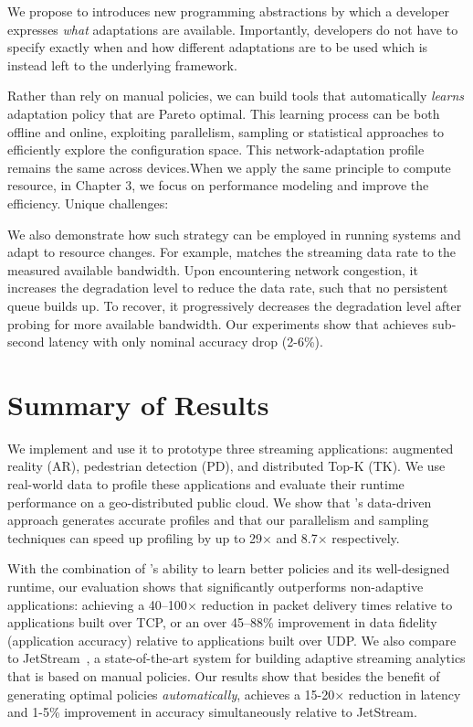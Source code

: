 \documentclass[thesis.tex]{subfiles}
\begin{document}
 We propose to introduces new programming
abstractions by which a developer expresses \emph{what} adaptations are
available. Importantly, developers do not have to specify exactly when and how
different adaptations are to be used which is instead left to the underlying
framework.

 Rather than rely on manual policies, we
can build tools that automatically \emph{learns} adaptation policy that are
Pareto optimal. This learning process can be both offline and online, exploiting
parallelism, sampling or statistical approaches to efficiently explore the
configuration space. This network-adaptation profile remains the same across
devices.When we apply the same principle to compute resource, in Chapter 3, we
focus on performance modeling and improve the efficiency. Unique challenges:

We also demonstrate how such strategy can be employed in running systems and
adapt to resource changes. For example, \sysname{} matches the streaming data
rate to the measured available bandwidth. Upon encountering network congestion,
it increases the degradation level to reduce the data rate, such that no
persistent queue builds up. To recover, it progressively decreases the
degradation level after probing for more available bandwidth. Our experiments
show that \sysname{} achieves sub-second latency with only nominal accuracy drop
(2-6\%).

\section{Summary of Results}
\label{sec:summary-results-1}


We implement \awstream{} and use it to prototype three streaming applications:
augmented reality (AR), pedestrian detection (PD), and distributed Top-K
(TK). We use real-world data to profile these applications and evaluate their
runtime performance on a geo-distributed public cloud.  We show that
\awstream{}'s data-driven approach generates accurate profiles and that our
parallelism and sampling techniques can speed up profiling by up to 29$\times$
and 8.7$\times$ respectively.

With the combination of \awstream{}'s ability to learn better policies and its
well-designed runtime, our evaluation shows that \awstream{} significantly
outperforms non-adaptive applications: achieving a 40--100$\times$ reduction in
packet delivery times relative to applications built over TCP, or an over
45--88\% improvement in data fidelity (application accuracy) relative to
applications built over UDP. We also compare \awstream{} to
JetStream~\cite{rabkin2014aggregation}, a state-of-the-art system for building
adaptive streaming analytics that is based on manual policies. Our results show
that besides the benefit of generating optimal policies \textit{automatically},
\awstream{} achieves a 15-20$\times$ reduction in latency and 1-5\% improvement
in accuracy simultaneously relative to JetStream.
\end{document}
